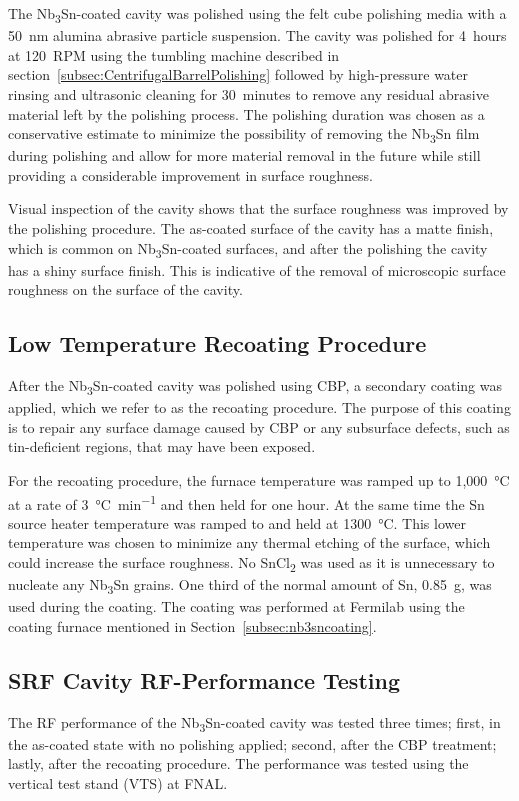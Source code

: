 \documentclass[reprint,amsmath,amssymb,aps]{revtex4-2}%
\begin{document}
The Nb\textsubscript{3}Sn-coated cavity was polished using the felt cube polishing media with a 50~nm alumina abrasive particle suspension. The cavity was polished for 4~hours at 120~RPM using the tumbling machine described in section~\ref{subsec:CentrifugalBarrelPolishing} followed by high-pressure water rinsing and ultrasonic cleaning for 30~minutes to remove any residual abrasive material left by the polishing process. The polishing duration was chosen as a conservative estimate to minimize the possibility of removing the Nb\textsubscript{3}Sn film during polishing and allow for more material removal in the future while still providing a considerable improvement in surface roughness.

Visual inspection of the cavity shows that the surface roughness was improved by the polishing procedure. The as-coated surface of the cavity has a matte finish, which is common on Nb\textsubscript{3}Sn-coated surfaces, and after the polishing the cavity has a shiny surface finish. This is indicative of the removal of microscopic surface roughness on the surface of the cavity.
%
\subsection{Low Temperature Recoating Procedure}%
\label{subsec:recoating}%
After the Nb\textsubscript{3}Sn-coated cavity was polished using CBP, a secondary coating was applied, which we refer to as the recoating procedure. The purpose of this coating is to repair any surface damage caused by CBP or any subsurface defects, such as tin-deficient regions, that may have been exposed.

For the recoating procedure, the furnace temperature was ramped up to 1,000~°C at a rate of 3~\unit{\celsius\per\minute} and then held for one hour. At the same time the Sn source heater temperature was ramped to and held at 1300~°C.
This lower temperature was chosen to minimize any thermal etching of the surface, which could increase the surface roughness. No SnCl\textsubscript{2} was used as it is unnecessary to nucleate any Nb\textsubscript{3}Sn grains. One third of the normal amount of Sn, 0.85~g, was used during the coating. The coating was performed at Fermilab using the coating furnace mentioned in Section~\ref{subsec:nb3sncoating}.

%
\subsection{SRF Cavity RF-Performance Testing}%
\label{subsec:vts}%
The RF performance of the Nb\textsubscript{3}Sn-coated cavity was tested three times; first, in the as-coated state with no polishing applied; second, after the CBP treatment; lastly, after the recoating procedure. The performance was tested using the vertical test stand (VTS) at FNAL\cite{pischalnikov2014rf}.
\end{document}
